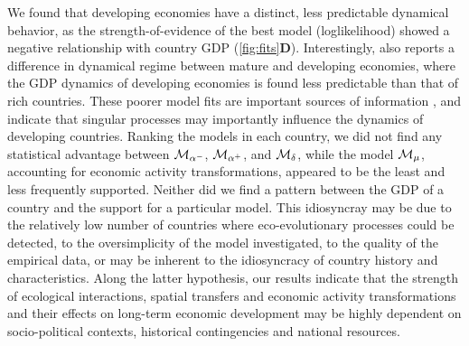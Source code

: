 We found that developing economies have a distinct, less predictable dynamical behavior, as the strength-of-evidence of the best model (loglikelihood) showed a negative relationship with country GDP (\cref{fig:fits}\textbf{D}). Interestingly, \citep{Cristelli2015} also reports a difference in dynamical regime between mature and developing economies, where the GDP dynamics of developing economies is found less predictable than that of rich countries. These poorer model fits are important sources of information \citep{Curtsdotter2019}, and indicate that singular processes may importantly influence the dynamics of developing countries.
% 
Ranking the models in each country, we did not find any statistical advantage between $\mathcal{M}_{\alpha^-}$, $\mathcal{M}_{\alpha^+}$, and $\mathcal{M}_\delta$, while the model $\mathcal{M}_\mu$, accounting for economic activity transformations, appeared to be the least and less frequently supported.
% 
% 
% 
Neither did we find a pattern between the GDP of a country and the support for a particular model. This idiosyncray may be due to the relatively low number of countries where eco-evolutionary processes could be detected, to the oversimplicity of the model investigated, to the quality of the empirical data, or may be inherent to the idiosyncracy of country history and characteristics.
% 
Along the latter hypothesis, our results indicate that the strength of ecological interactions, spatial transfers and economic activity transformations and their effects on long-term economic development may be highly dependent on socio-political contexts, historical contingencies and national resources.

